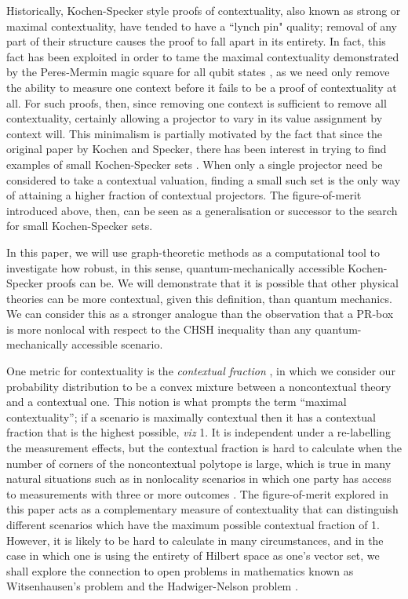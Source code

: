 \documentclass{amsart}
\theoremstyle{definition}
\begin{document}
Historically, Kochen-Specker style proofs of contextuality, also known as strong or maximal contextuality, have tended to have a ``lynch pin" quality; removal of any part of their structure causes the proof to fall apart in its entirety. In fact, this fact has been exploited in order to tame the maximal contextuality demonstrated by the Peres-Mermin magic square for all qubit states \cite{Berm2016}, as we need only remove the ability to measure one context before it fails to be a proof of contextuality at all. For such proofs, then, since removing one context is sufficient to remove all contextuality, certainly allowing a projector to vary in its value assignment by context will. This minimalism is partially motivated by the fact that since the original paper by Kochen and Specker, there has been interest in trying to find examples of small Kochen-Specker sets \cite{Aren2011}. When only a single projector need be considered to take a contextual valuation, finding a small such set is the only way of attaining a higher fraction of contextual projectors. The figure-of-merit introduced above, then, can be seen as a generalisation or successor to the search for small Kochen-Specker sets.

In this paper, we will use graph-theoretic methods as a computational tool to investigate how robust, in this sense, quantum-mechanically accessible Kochen-Specker proofs can be. We will demonstrate that it is possible that other physical theories can be more contextual, given this definition, than quantum mechanics. We can consider this as a stronger analogue than the observation that a PR-box is more nonlocal with respect to the CHSH inequality than any quantum-mechanically accessible scenario.

One metric for contextuality is the \emph{contextual fraction} \cite{Abra2017}, in which we consider our probability distribution to be a convex mixture between a noncontextual theory and a contextual one. This notion is what prompts the term ``maximal contextuality''; if a scenario is maximally contextual then it has a contextual fraction that is the highest possible, \emph{viz} 1. It is independent under a  re-labelling the measurement effects, but the contextual fraction is hard to calculate when the number of corners of the noncontextual polytope is large, which is true in many natural situations such as in nonlocality scenarios in which one party has access to measurements with three or more outcomes \cite{SimmCC}. The figure-of-merit explored in this paper acts as a complementary measure of contextuality that can distinguish different scenarios which have the maximum possible contextual fraction of 1. However, it is likely to be hard to calculate in many circumstances, and in the case in which one is using the entirety of Hilbert space as one's vector set, we shall explore the connection to open problems in mathematics known as Witsenhausen's problem \cite{Wits1974} and the Hadwiger-Nelson problem \cite{Soif2008}.
\end{document}

